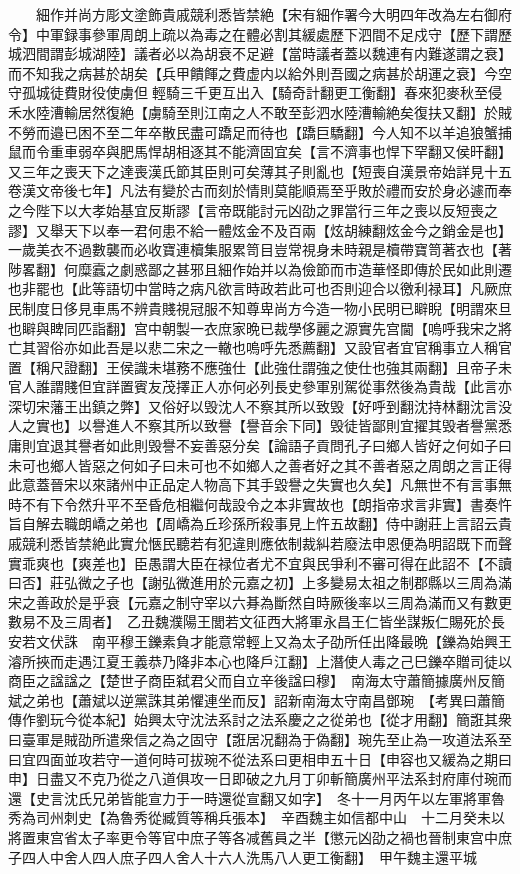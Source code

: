 　　細作并尚方彫文塗飾貴戚競利悉皆禁絶【宋有細作署今大明四年改為左右御府令】中軍録事參軍周朗上疏以為毒之在體必割其緩處歷下泗間不足戍守【歷下謂歷城泗間謂彭城湖陸】議者必以為胡衰不足避【當時議者蓋以魏連有内難遂謂之衰】而不知我之病甚於胡矣【兵甲饋餫之費虚内以給外則吾國之病甚於胡運之衰】今空守孤城徒費財役使虜但輕騎三千更互出入【騎奇計翻更工衡翻】春來犯麥秋至侵禾水陸漕輸居然復絶【虜騎至則江南之人不敢至彭泗水陸漕輸絶矣復扶又翻】於賊不勞而邉已困不至二年卒散民盡可蹻足而待也【蹻巨驕翻】今人知不以羊追狼蟹捕鼠而令重車弱卒與肥馬悍胡相逐其不能濟固宜矣【言不濟事也悍下罕翻又侯旰翻】又三年之喪天下之達喪漢氏節其臣則可矣薄其子則亂也【短喪自漢景帝始詳見十五卷漢文帝後七年】凡法有變於古而刻於情則莫能順焉至乎敗於禮而安於身必遽而奉之今陛下以大孝始基宜反斯謬【言帝既能討元凶劭之罪當行三年之喪以反短喪之謬】又舉天下以奉一君何患不給一體炫金不及百兩【炫胡練翻炫金今之銷金是也】一歲美衣不過數襲而必收寶連櫝集服累笥目豈常視身未時親是櫝帶寶笥著衣也【著陟畧翻】何糜蠧之劇惑鄙之甚邪且細作始并以為儉節而市造華怪即傳於民如此則遷也非罷也【此等語切中當時之病凡欲言時政若此可也否則迎合以徼利禄耳】凡厥庶民制度日侈見車馬不辨貴賤視冠服不知尊卑尚方今造一物小民明已䁹睨【明謂來旦也䁹與睥同匹詣翻】宫中朝製一衣庶家晩已裁學侈麗之源實先宫閫【嗚呼我宋之將亡其習俗亦如此吾是以悲二宋之一轍也嗚呼先悉薦翻】又設官者宜官稱事立人稱官置【稱尺證翻】王侯識未堪務不應強仕【此強仕謂強之使仕也強其兩翻】且帝子未官人誰謂賤但宜詳置賓友茂擇正人亦何必列長史參軍别駕從事然後為貴哉【此言亦深切宋藩王出鎮之弊】又俗好以毁沈人不察其所以致毁【好呼到翻沈持林翻沈言没人之實也】以譽進人不察其所以致譽【譽音余下同】毁徒皆鄙則宜擢其毁者譽黨悉庸則宜退其譽者如此則毁譽不妄善惡分矣【論語子貢問孔子曰鄉人皆好之何如子曰未可也鄉人皆惡之何如子曰未可也不如鄉人之善者好之其不善者惡之周朗之言正得此意蓋晉宋以來諸州中正品定人物高下其手毀譽之失實也久矣】凡無世不有言事無時不有下令然升平不至昏危相繼何哉設令之本非實故也【朗指帝求言非實】書奏忤旨自解去職朗嶠之弟也【周嶠為丘珍孫所殺事見上忤五故翻】侍中謝莊上言詔云貴戚競利悉皆禁絶此實允愜民聽若有犯違則應依制裁糾若廢法申恩便為明詔既下而聲實乖爽也【爽差也】臣愚謂大臣在禄位者尤不宜與民爭利不審可得在此詔不【不讀曰否】莊弘微之子也【謝弘微進用於元嘉之初】上多變易太祖之制郡縣以三周為滿宋之善政於是乎衰【元嘉之制守宰以六朞為斷然自時厥後率以三周為滿而又有數更數易不及三周者】　乙丑魏濮陽王閭若文征西大將軍永昌王仁皆坐謀叛仁賜死於長安若文伏誅　南平穆王鑠素負才能意常輕上又為太子劭所任出降最晩【鑠為始興王濬所挾而走遇江夏王義恭乃降非本心也降戶江翻】上潛使人毒之己巳鑠卒贈司徒以商臣之諡諡之【楚世子商臣弑君父而自立辛後諡曰穆】　南海太守蕭簡據廣州反簡斌之弟也【蕭斌以逆黨誅其弟懼連坐而反】詔新南海太守南昌鄧琬　【考異曰蕭簡傳作劉玩今從本紀】始興太守沈法系討之法系慶之之從弟也【從才用翻】簡誑其衆曰臺軍是賊劭所遣衆信之為之固守【誑居况翻為于偽翻】琬先至止為一攻道法系至曰宜四面並攻若守一道何時可拔琬不從法系曰更相申五十日【申容也又緩為之期曰申】日盡又不克乃從之八道俱攻一日即破之九月丁卯斬簡廣州平法系封府庫付琬而還【史言沈氏兄弟皆能宣力于一時還從宣翻又如字】　冬十一月丙午以左軍將軍魯秀為司州刺史【為魯秀從臧質等稱兵張本】　辛酉魏主如信都中山　十二月癸未以將置東宫省太子率更令等官中庶子等各减舊員之半【懲元凶劭之禍也晉制東宫中庶子四人中舍人四人庶子四人舍人十六人洗馬八人更工衡翻】　甲午魏主還平城

